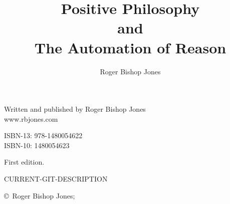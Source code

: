 \documentclass[10pt,titlepage]{book}
\title{Positive Philosophy\\ and\\ The Automation of Reason}
\author{Roger Bishop Jones}
\begin{document}
\frontmatter

\begin{titlepage}
\maketitle


\hspace{2in}

\vfill

\begin{centering}

Written and published by Roger Bishop Jones\\
www.rbjones.com\\
\vspace{0.2in}

ISBN-13: 978-1480054622\\
ISBN-10: 1480054623

\vspace{0.2in}

{\footnotesize

First edition.

\vspace{0.2in}

\tiny{CURRENT-GIT-DESCRIPTION}

\vspace{0.2in}

\copyright\ Roger Bishop Jones;

}%

\end{centering}

\thispagestyle{empty}

\end{titlepage}
\end{document}
